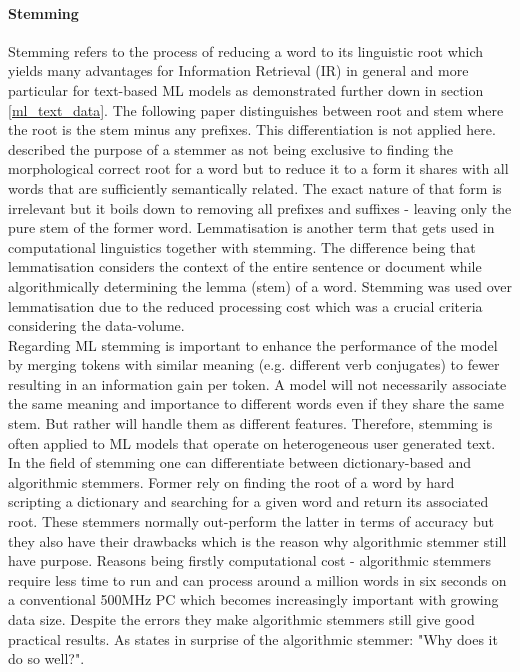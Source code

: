 \paragraph*{Stemming} \label{word_stemming}
Stemming refers to the process of reducing a word to its linguistic root which yields many advantages for Information Retrieval (IR) in general and more particular for text-based ML models as demonstrated further down in section \ref{ml_text_data}. The following paper \textcite{Lovins1968} distinguishes between root and stem where the root is the stem minus any prefixes. This differentiation is not applied here. 
\textcite{Weissweiler2018} described the purpose of a stemmer as not being exclusive to finding the morphological correct root for a word but to reduce it to a form it shares with all words that are sufficiently semantically related. The exact nature of that form is irrelevant but it boils down to removing all prefixes and suffixes - leaving only the pure stem of the former word. Lemmatisation is another term that gets used in computational linguistics together with stemming. The difference being that lemmatisation considers the context of the entire sentence or document while algorithmically determining the lemma (stem) of a word. Stemming was used over lemmatisation due to the reduced processing cost which was a crucial criteria considering the data-volume.\\
Regarding ML stemming is important to enhance the performance of the model by merging tokens with similar meaning (e.g. different verb conjugates) to fewer resulting in an information gain per token. A model will not necessarily associate the same meaning and importance to different words even if they share the same stem. But rather will handle them as different features. Therefore, stemming is often applied to ML models that operate on heterogeneous user generated text.\\
In the field of stemming one can differentiate between dictionary-based and algorithmic stemmers. Former rely on finding the root of a word by hard scripting a dictionary and searching for a given word and return its associated root. These stemmers normally out-perform the latter in terms of accuracy but they also have their drawbacks which is the reason why algorithmic stemmer still have purpose. Reasons being firstly computational cost - algorithmic stemmers require less time to run and can process around a million words in six seconds on a conventional 500MHz PC \parencite{Porter2001} which becomes increasingly important with growing data size. Despite the errors they make algorithmic stemmers still give good practical results. As \textcite{Krovetz1995} states in surprise of the algorithmic stemmer: "Why does it do so well?".\\ 
